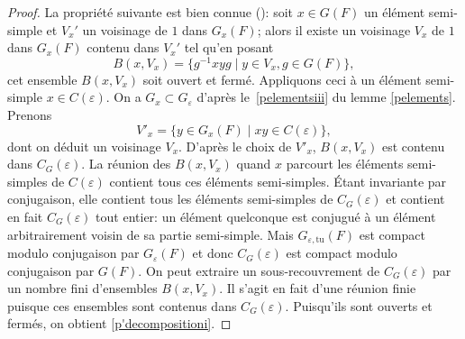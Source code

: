 \documentclass[JEP,XML,SOM,Unicode,francais]{cedram}
\let\epsilon\varepsilon
\let\sep\mid
\newcommand{\tu}{\mathrm{tu}}
\theoremstyle{plain}
\theoremstyle{definition}
\begin{document}
\begin{proof}
La propriété suivante est bien connue (\cf \cite[Cor.\,2.4]{HC}): soit \hbox{$x\in G(F)$} un élément semi-simple et $V_{x}'$ un voisinage de $1$ dans $G_{x}(F)$; alors il existe un voisinage $V_{x}$ de $1$ dans $G_{x}(F)$ contenu dans $V_{x}'$ tel qu'en posant
\[
B(x,V_{x})=\{ g^{-1} xyg\sep y\in V_{x}, g\in G(F)\},
\]
cet ensemble $B(x,V_{x})$ soit ouvert et fermé. Appliquons ceci à un élément semi-simple $x \in C(\epsilon)$. On a $G_{x}\subset G_{\epsilon}$ d'après le~\eqref{pelementsiii} du lemme \ref{pelements}. Prenons
\[
V'_{x}=\{y\in G_{x}(F)\sep xy\in C(\epsilon)\},
\]
dont on déduit un voisinage $V_{x}$. D'après le choix de $V'_{x}$, $B(x,V_{x})$ est contenu dans $C_{G}(\epsilon)$. La réunion des $B(x,V_{x})$ quand $x$ parcourt les éléments semi-simples de $C(\epsilon)$ contient tous ces éléments semi-simples. Étant invariante par conjugaison, elle contient tous les éléments semi-simples de $C_{G}(\epsilon)$ et contient en fait $C_{G}(\epsilon)$ tout entier: un élément quelconque est conjugué à un élément arbitrairement voisin de sa partie semi-simple. Mais $G_{\epsilon,\tu}(F)$ est compact modulo conjugaison par $G_{\epsilon}(F)$ et donc $C_{G}(\epsilon)$ est compact modulo conjugaison par $G(F)$. On peut extraire un sous-recouvrement de $C_{G}(\epsilon)$ par un nombre fini d'ensembles $B(x,V_{x})$. Il s'agit en fait d'une réunion finie puisque ces ensembles sont contenus dans $C_{G}(\epsilon)$. Puisqu'ils sont ouverts et fermés, on obtient \eqref{p'decompositioni}.


\end{proof}
\end{document}
